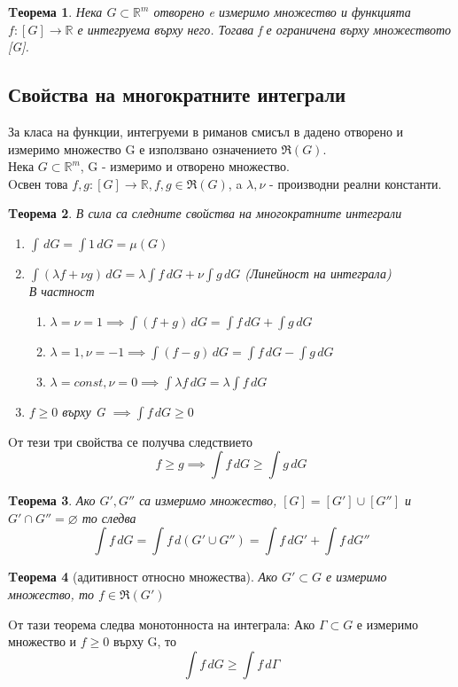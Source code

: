 \documentclass[a4paper,fleqn,12pt]{article}
\newtheorem{theorem}{Tеорема}[subsection]
\theoremstyle{definition}
\begin{document}
\begin{theorem}
Нека $G \subset \mathbb{R}^m$ отворено e измеримо множество и функцията $f: [G] \to \mathbb{R}$ е интегруема върху него. Тогава f  е ограничена върху множеството [G]. 
\end{theorem}

\subsection{Свойства на многократните интеграли}
За класа на функции, интегруеми в риманов смисъл в дадено отворено и измеримо множество G е използвано означението $\Re(G)$. \\
Нека $G \subset \mathbb{R}^m$, G - измеримо и отворено множество.\\
Oсвен това $f,g: [G] \to \mathbb{R}, f,g \in \Re(G)$, a $\lambda, \nu$ - производни реални константи.

\begin{theorem}
В сила са следните свойства на многократните интеграли
\begin{enumerate}
\item $\int \, dG = \int 1 \, dG = \mu(G)$
\item $\int (\lambda f + \nu g) \, dG = \lambda \int f \, dG + \nu \int g \, dG$ (Линейност на интеграла)\\
В частност
\begin{enumerate}
\item $\lambda = \nu = 1 \implies \int (f+g) \, dG  = \int f \, dG + \int g \, dG$ 
\item $\lambda = 1,  \nu = -1 \implies \int (f-g) \, dG  = \int f \, dG - \int g \, dG$ 
\item $\lambda = const,  \nu = 0 \implies \int \lambda f \, dG  = \lambda \int f \, dG$ 
\end{enumerate}
\item $f \geq 0$ върху G $\implies \int f \, dG \geq 0$
\end{enumerate}
\end{theorem}
Oт тези три свойства се получва следствието 
$$f \geq g \implies \int f \, dG \geq \int g \, dG$$

\begin{theorem}
Ако $G', G''$ са измеримо множество, $[G] = [G'] \cup [G'']$ и $G' \cap G'' = \varnothing$ то следва
$$\int f \, dG = \int f \, d(G' \cup G'') =\int f \, dG' + \int f \, dG'' $$
\end{theorem}

\begin{theorem}[адитивност относно множества]
Ако $G' \subset G$ е измеримо множество, то $f \in \Re(G')$
\end{theorem}
Oт тази теорема следва монотонноста на интеграла: Ако $\Gamma \subset G$ е измеримо множество и $f \geq 0$ върху  G, то 
$$\int f \, dG \geq \int f \, d\Gamma$$
\end{document}
